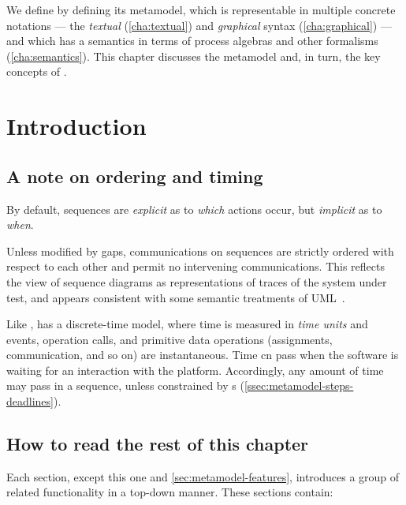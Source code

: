 

We define \langname{} by defining its
metamodel, which is representable in multiple concrete notations ---
the \emph{textual} (\cref{cha:textual}) and \emph{graphical}
syntax (\cref{cha:graphical}) --- and which has a semantics in terms
of process algebras and other formalisms (\cref{cha:semantics}).  This
chapter discusses the metamodel and, in turn, the key concepts
of \langname.

\section{Introduction}\label{sec:metamodel-intro}

\subsection{A note on ordering and timing}\label{ssec:metamodel-intro-ordering}

By default, \langname{} sequences are \emph{explicit}
as to \emph{which} actions occur, but \emph{implicit} as to
\emph{when}.

Unless modified by gaps,
communications on \langname{} sequences are strictly ordered with
respect to each other and permit no intervening communications.  This
reflects the view of sequence diagrams as representations of traces of
the system under test, and appears consistent with some semantic
treatments of UML~\cite{lima-semantics}.  

Like \robochart, \langname{} has a discrete-time model, where time is
measured in \emph{time units} and events, operation calls, and
primitive data operations (assignments, communication, and so on) are
instantaneous.  Time cn pass when the software is waiting for an
interaction with the platform.  Accordingly, any amount of time may
pass in a sequence, unless constrained by \mdeadlinestep s
(\cref{ssec:metamodel-steps-deadlines}).

\subsection{How to read the rest of this chapter}\label{ssec:metamodel-intro-readme}

Each section, except this one and \cref{sec:metamodel-features},
introduces a group of related \langname{}
functionality in a top-down manner.  These sections contain:

